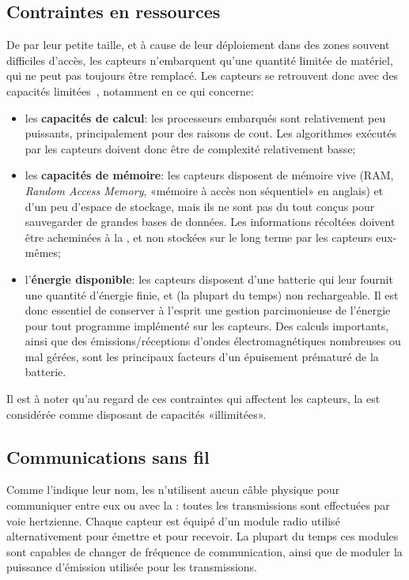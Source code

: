     \subsection{Contraintes en ressources}
De par leur petite taille, et à cause de leur déploiement dans des zones souvent difficiles d'accès, les capteurs n'embarquent qu'une quantité limitée de matériel, qui ne peut pas toujours être remplacé.
Les capteurs se retrouvent donc avec des capacités limitées~\cite{BMS13}, notamment en ce qui concerne:
\begin{itemize}
    \item les \textbf{capacités de calcul}: les processeurs embarqués sont relativement peu puissants, principalement pour des raisons de cout.
        Les algorithmes exécutés par les capteurs doivent donc être de complexité relativement basse;
    \item les \textbf{capacités de mémoire}: les capteurs disposent de mémoire vive (RAM, \textit{Random Access Memory}, «mémoire à accès non séquentiel» en anglais) et d'un peu d'espace de stockage, mais ils ne sont pas du tout conçus pour sauvegarder de grandes bases de données.
        Les informations récoltées doivent être acheminées à la \sdb, et non stockées sur le long terme par les capteurs eux-mêmes;
    \item l'\textbf{énergie disponible}: les capteurs disposent d'une batterie qui leur fournit une quantité d'énergie finie, et (la plupart du temps) non rechargeable.
        Il est donc essentiel de conserver à l'esprit une gestion parcimonieuse de l'énergie pour tout programme implémenté sur les capteurs.
        Des calculs importants, ainsi que des émissions/réceptions d'ondes électromagnétiques nombreuses ou mal gérées, sont les principaux facteurs d'un épuisement prématuré de la batterie.
\end{itemize}

Il est à noter qu'au regard de ces contraintes qui affectent les capteurs, la \sdb est considérée comme disposant de capacités «illimitées».

    \subsection{Communications sans fil}
Comme l'indique leur nom, les \rcsfs n'utilisent aucun câble physique pour communiquer entre eux ou avec la \sdb: toutes les transmissions sont effectuées par voie hertzienne.
Chaque capteur est équipé d'un module radio utilisé alternativement pour émettre et pour recevoir.
La plupart du temps ces modules sont capables de changer de fréquence de communication, ainsi que de moduler la puissance d'émission utilisée pour les transmissions.

